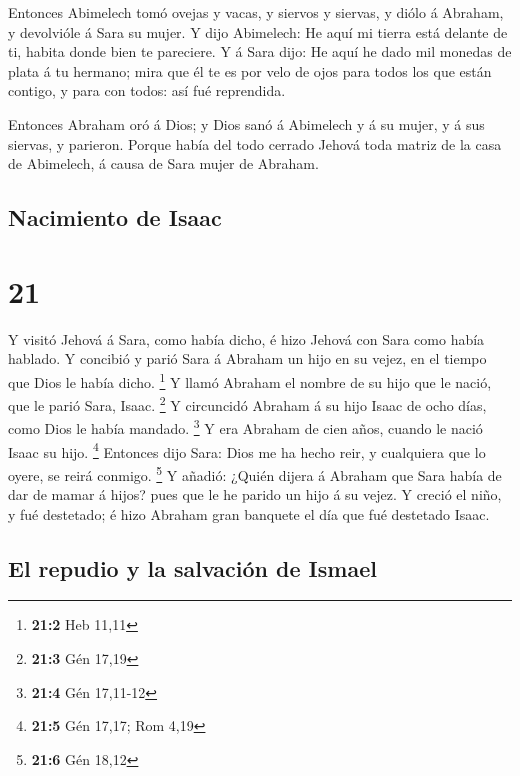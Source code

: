  Entonces Abimelech tomó ovejas y vacas, y siervos y
siervas, y diólo á Abraham, y devolvióle á Sara su mujer.
 Y dijo Abimelech: He aquí mi tierra está delante de ti,
habita donde bien te pareciere.  Y á Sara dijo: He aquí
he dado mil monedas de plata á tu hermano; mira que él te es por velo de
ojos para todos los que están contigo, y para con todos: así fué
reprendida.

 Entonces Abraham oró á Dios; y Dios sanó á Abimelech y á
su mujer, y á sus siervas, y parieron.  Porque había del
todo cerrado Jehová toda matriz de la casa de Abimelech, á causa de Sara
mujer de Abraham.

\hypertarget{nacimiento-de-isaac}{%
\subsection{Nacimiento de Isaac}\label{nacimiento-de-isaac}}

\hypertarget{section-20}{%
\section{21}\label{section-20}}

 Y visitó Jehová á Sara, como había dicho, é hizo Jehová
con Sara como había hablado.  Y concibió y parió Sara á
Abraham un hijo en su vejez, en el tiempo que Dios le había dicho.
\footnote{\textbf{21:2} Heb 11,11}  Y llamó Abraham el
nombre de su hijo que le nació, que le parió Sara, Isaac. \footnote{\textbf{21:3}
  Gén 17,19}  Y circuncidó Abraham á su hijo Isaac de ocho
días, como Dios le había mandado. \footnote{\textbf{21:4} Gén 17,11-12}
 Y era Abraham de cien años, cuando le nació Isaac su
hijo. \footnote{\textbf{21:5} Gén 17,17; Rom 4,19} 
Entonces dijo Sara: Dios me ha hecho reir, y cualquiera que lo oyere, se
reirá conmigo. \footnote{\textbf{21:6} Gén 18,12}  Y
añadió: ¿Quién dijera á Abraham que Sara había de dar de mamar á hijos?
pues que le he parido un hijo á su vejez.  Y creció el
niño, y fué destetado; é hizo Abraham gran banquete el día que fué
destetado Isaac.

\hypertarget{el-repudio-y-la-salvaciuxf3n-de-ismael}{%
\subsection{El repudio y la salvación de
Ismael}\label{el-repudio-y-la-salvaciuxf3n-de-ismael}}

